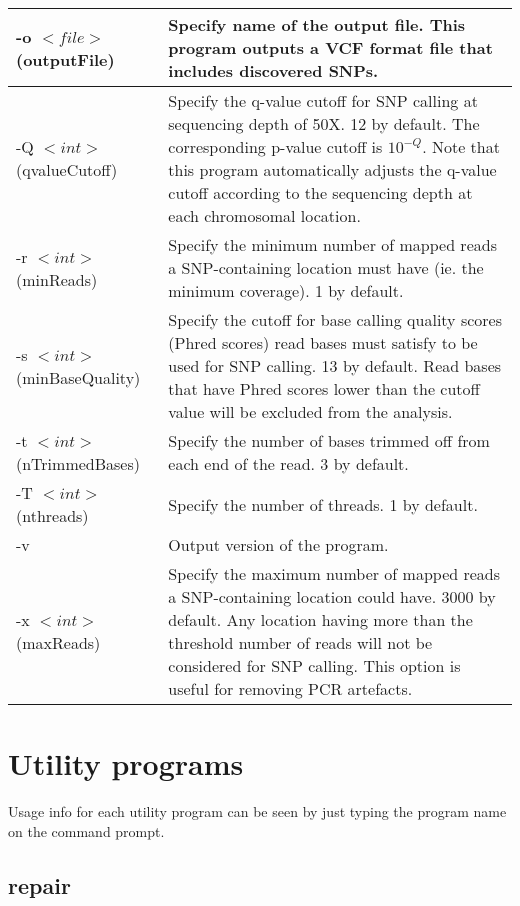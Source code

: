 \documentclass[12pt]{report}
\begin{document}
\begin{longtable}{|p{4.5cm}|p{11cm}|}
\hline
-o $<file>$ \newline (outputFile) & Specify name of the output file. This program outputs a VCF format file that includes discovered SNPs. \\
\hline
-Q $<int>$  \newline (qvalueCutoff) &  Specify the q-value cutoff for SNP calling at sequencing depth of 50X. 12 by default. The corresponding p-value cutoff is $10^{-Q}$. Note that this program automatically adjusts the q-value cutoff according to the sequencing depth at each chromosomal location.\\
\hline
-r $<int>$ \newline (minReads) & Specify the minimum number of mapped reads a SNP-containing location must have (ie. the minimum coverage). 1 by default. \\
\hline
-s $<int>$ \newline (minBaseQuality) & Specify the cutoff for base calling quality scores (Phred scores) read bases must satisfy to be used for SNP calling. 13 by default. Read bases that have Phred scores lower than the cutoff value will be excluded from the analysis. \\
\hline
-t $<int>$ \newline (nTrimmedBases) & Specify the number of bases trimmed off from each end of the read. 3 by default. \\
\hline
-T $<int>$ \newline (nthreads) & Specify the number of threads. 1 by default. \\
\hline
-v & Output version of the program. \\
\hline
-x $<int>$ \newline (maxReads) & Specify the maximum number of mapped reads a SNP-containing location could have. 3000 by default. Any location having more than the threshold number of reads will not be considered for SNP calling. This option is useful for removing PCR artefacts. \\
\hline
\end{longtable}



\chapter{Utility programs}

Usage info for each utility program can be seen by just typing the program name on the command prompt.

\section{repair}
\end{document}
